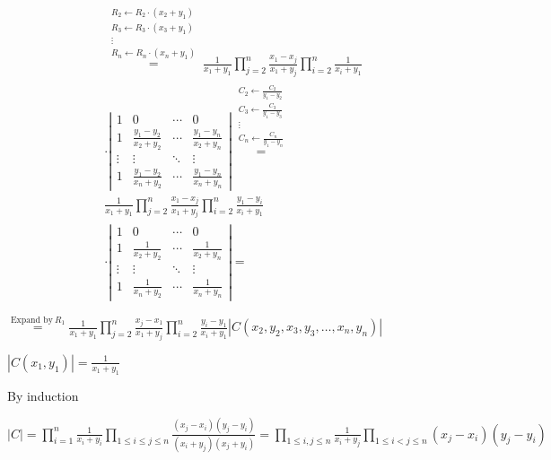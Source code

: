\documentclass{article}
\begin{document}
\begin{multline*}
\overset{\substack{R_{2} \leftarrow R_{2} \cdot (x_{2} + y_{1}) \\ R_{3} \leftarrow R_{3} \cdot (x_{3} + y_{1}) \\ \vdots \\ R_{n} \leftarrow R_{n} \cdot (x_{n} + y_{1})}}{=} \frac{1}{x_{1}+y_{1}}\prod_{j=2}^{n}\frac{x_{1}-x_{j}}{x_{1}+y_{j}} \prod_{i=2}^{n}\frac{1}{x_{i} + y_{1}} \\
\cdot \left|\begin{matrix} 1 & 0 & \cdots & 0 \\ 1 & \frac{y_{1}-y_{2}}{x_{2}+y_{2}} & \cdots & \frac{y_{1}-y_{n}}{x_{2}+y_{n}} \\ \vdots & \vdots & \ddots & \vdots \\ 1 & \frac{y_{1}-y_{2}}{x_{n}+y_{2}} & \cdots & \frac{y_{1}-y_{n}}{x_{n}+y_{n}} \end{matrix}\right| \overset{\substack{C_{2} \leftarrow \frac{C_{2}}{y_{1}-y_{2}} \\ C_{3} \leftarrow \frac{C_{3}}{y_{1}-y_{3}} \\ \vdots \\ C_{n} \leftarrow \frac{C_{n}}{y_{1}-y_{n}}}}{=} \\
\frac{1}{x_{1}+y_{1}}\prod_{j=2}^{n}\frac{x_{1}-x_{j}}{x_{1}+y_{j}} \prod_{i=2}^{n}\frac{y_{1}-y_{i}}{x_{i} + y_{1}} \\
\cdot \left|\begin{matrix} 1 & 0 & \cdots & 0 \\ 1 & \frac{1}{x_{2}+y_{2}} & \cdots & \frac{1}{x_{2}+y_{n}} \\ \vdots & \vdots & \ddots & \vdots \\ 1 & \frac{1}{x_{n}+y_{2}} & \cdots & \frac{1}{x_{n}+y_{n}} \end{matrix}\right| =
\end{multline*}

\( \overset{\text{Expand by}\ R_{1}}{=} \frac{1}{x_{1}+y_{1}}\prod_{j=2}^{n}\frac{x_{j}-x_{1}}{x_{1}+y_{j}} \prod_{i=2}^{n}\frac{y_{i}-y_{1}}{x_{i} + y_{1}} |C(x_{2},y_{2},x_{3},y_{3},\ldots,x_{n},y_{n})| \)

\( |C(x_{1},y_{1})| = \frac{1}{x_{1}+y_{1}} \)

By induction

\( |C| = \prod_{i=1}^{n}\frac{1}{x_{i}+y_{i}} \prod_{1 \leq i \leq j \leq n} \frac{(x_{j}-x_{i})(y_{j}-y_{i})}{(x_{i}+y_{j})(x_{j} + y_{i})} = \prod_{1 \leq i,j \leq n}\frac{1}{x_{i}+y_{j}} \prod_{1 \leq i < j \leq n} (x_{j}-x_{i})(y_{j}-y_{i}) \)
\end{document}
